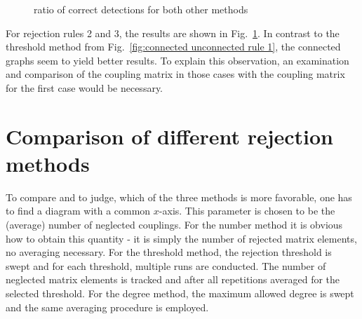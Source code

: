 \documentclass{article}
\begin{document}
	 	
	\begin{figure}[h]
	\caption{ratio of correct detections for both other methods}
	\label{fig:connected unconnected rule 2 and 3}
	\end{figure}
For rejection rules 2 and 3, the results are shown in Fig.~\ref{fig:connected unconnected rule 2 and 3}. In contrast to the threshold method from Fig.~\ref{fig:connected unconnected rule 1}, the connected graphs seem to yield better results. To explain this observation, an examination and comparison of the coupling matrix in those cases with the coupling matrix for the first case would be necessary. 

\section{Comparison of different rejection methods}\label{sec:comparison of rejection methods}
To compare and to judge, which of the three methods is more favorable, one has to find a diagram with a common $x$-axis. This parameter is chosen to be the (average) number of neglected couplings. For the number method it is obvious how to obtain this quantity - it is simply the number of rejected matrix elements, no averaging necessary. For the threshold method, the rejection threshold is swept and for each threshold, multiple runs are conducted. The number of neglected matrix elements is tracked and after all repetitions averaged for the selected threshold. For the degree method, the maximum allowed degree is swept and the same averaging procedure is employed. 
\end{document}
